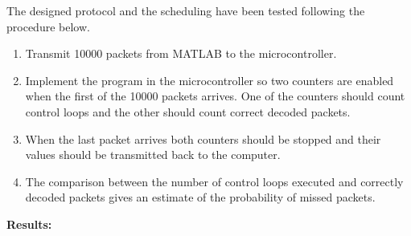 The designed protocol and the scheduling have been tested following the procedure below.
\begin{enumerate}
	\item Transmit 10000 packets from MATLAB to the microcontroller.
    \item Implement the program in the microcontroller so two counters are enabled when the first of the 10000 packets arrives. One of the counters should count control loops and the other should count correct decoded packets.
	\item When the last packet arrives both counters should be stopped and their values should be transmitted back to the computer. 
	\item The comparison between the number of control loops executed and correctly decoded packets gives an estimate of the probability of missed packets.
\end{enumerate} 
\textbf{Results:}

